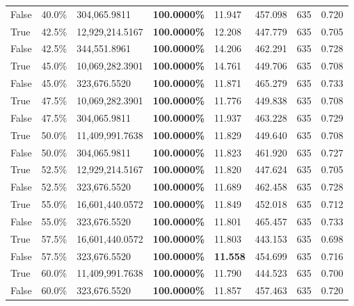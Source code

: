 \begin{table}[H]
\begin{tabular}{lllrllll}
\cline{1-8}
False & 40.0\% & 304,065.9811 & \bfseries \color{red} 100.0000\% & 11.947 & 457.098 & 635 & 0.720 \\
\cline{1-8}
True & 42.5\% & 12,929,214.5167 & \bfseries \color{red} 100.0000\% & 12.208 & 447.779 & 635 & 0.705 \\
\cline{1-8}
False & 42.5\% & 344,551.8961 & \bfseries \color{red} 100.0000\% & 14.206 & 462.291 & 635 & 0.728 \\
\cline{1-8}
True & 45.0\% & 10,069,282.3901 & \bfseries \color{red} 100.0000\% & 14.761 & 449.706 & 635 & 0.708 \\
\cline{1-8}
False & 45.0\% & 323,676.5520 & \bfseries \color{red} 100.0000\% & 11.871 & 465.279 & 635 & 0.733 \\
\cline{1-8}
True & 47.5\% & 10,069,282.3901 & \bfseries \color{red} 100.0000\% & 11.776 & 449.838 & 635 & 0.708 \\
\cline{1-8}
False & 47.5\% & 304,065.9811 & \bfseries \color{red} 100.0000\% & 11.937 & 463.228 & 635 & 0.729 \\
\cline{1-8}
True & 50.0\% & 11,409,991.7638 & \bfseries \color{red} 100.0000\% & 11.829 & 449.640 & 635 & 0.708 \\
\cline{1-8}
False & 50.0\% & 304,065.9811 & \bfseries \color{red} 100.0000\% & 11.823 & 461.920 & 635 & 0.727 \\
\cline{1-8}
True & 52.5\% & 12,929,214.5167 & \bfseries \color{red} 100.0000\% & 11.820 & 447.624 & 635 & 0.705 \\
\cline{1-8}
False & 52.5\% & 323,676.5520 & \bfseries \color{red} 100.0000\% & 11.689 & 462.458 & 635 & 0.728 \\
\cline{1-8}
True & 55.0\% & 16,601,440.0572 & \bfseries \color{red} 100.0000\% & 11.849 & 452.018 & 635 & 0.712 \\
\cline{1-8}
False & 55.0\% & 323,676.5520 & \bfseries \color{red} 100.0000\% & 11.801 & 465.457 & 635 & 0.733 \\
\cline{1-8}
True & 57.5\% & 16,601,440.0572 & \bfseries \color{red} 100.0000\% & 11.803 & 443.153 & 635 & 0.698 \\
\cline{1-8}
False & 57.5\% & 323,676.5520 & \bfseries \color{red} 100.0000\% & \bfseries \color{red} 11.558 & 454.699 & 635 & 0.716 \\
\cline{1-8}
True & 60.0\% & 11,409,991.7638 & \bfseries \color{red} 100.0000\% & 11.790 & 444.523 & 635 & 0.700 \\
\cline{1-8}
False & 60.0\% & 323,676.5520 & \bfseries \color{red} 100.0000\% & 11.857 & 457.463 & 635 & 0.720 \\

\end{tabular}
\end{table}
